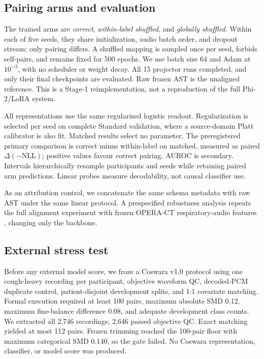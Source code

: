 \documentclass{article}
\newcommand{\deltanll}{\Delta(-\mathrm{NLL})}
\begin{document}
\subsection{Pairing arms and evaluation}
The trained arms are \emph{correct}, \emph{within-label shuffled}, and \emph{globally
shuffled}. Within each of five seeds, they share initialization, audio batch order, and
dropout stream; only pairing differs. A shuffled mapping is sampled once per seed, forbids
self-pairs, and remains fixed for 500 epochs. We use batch size 64 and Adam at $10^{-3}$,
with no scheduler or weight decay. All 15 projector runs completed, and only their final
checkpoints are evaluated. Raw frozen AST is the unaligned reference. This is a Stage-1
reimplementation, not a reproduction of the full Phi-2/LoRA system.

All representations use the same regularized logistic readout. Regularization is selected
per seed on complete Standard validation, where a source-domain Platt calibrator is also
fit. Matched results select no parameter. The preregistered primary comparison is correct
minus within-label on matched, measured as paired $\deltanll$; positive values favour
correct pairing. AUROC is secondary. Intervals hierarchically resample participants and
seeds while retaining paired arm predictions. Linear probes measure decodability, not
causal classifier use.

As an attribution control, we concatenate the same schema metadata with raw AST under the
same linear protocol. A prespecified robustness analysis repeats the full alignment
experiment with frozen OPERA-CT respiratory-audio features \cite{zhang2024opera}, changing
only the backbone.

\subsection{External stress test}
Before any external model score, we froze a Coswara v1.0 protocol
\cite{bhattacharya2023coswara} using one cough-heavy recording per participant, objective
waveform QC, decoded-PCM duplicate control, patient-disjoint development splits, and 1:1
covariate matching. Formal execution required at least 100 pairs, maximum absolute SMD
0.12, maximum fine-balance difference 0.08, and adequate development class counts. We
extracted all 2,746 recordings; 2,646 passed objective QC. Exact matching yielded at most
112 pairs. Frozen trimming reached the 100-pair floor with maximum categorical SMD 0.140,
so the gate failed. No Coswara representation, classifier, or model score was produced.
\end{document}

